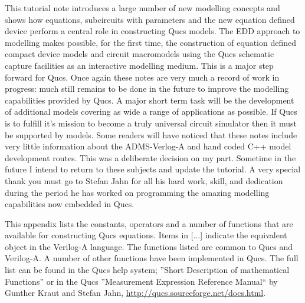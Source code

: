 
This tutorial note introduces a large number of new modelling concepts
and shows how equations, subcircuits with parameters and the new
equation defined device perform a central role in constructing Qucs
models. The EDD approach to modelling makes possible, for the first
time, the construction of equation defined compact device models and
circuit macromodels using the Qucs schematic capture facilities as an
interactive modelling medium.  This is a major step forward for
Qucs. Once again these notes are very much a record of work in
progress: much still remains to be done in the future to improve the
modelling capabilities provided by Qucs. A major short term task will
be the development of additional models covering as wide a range of
applications as possible. If Qucs is to fulfill it's mission to become
a truly universal circuit simulator then it must be supported by
models.  Some readers will have noticed that these notes include very
little information about the ADMS-Verlog-A and hand coded C++ model
development routes. This was a deliberate decision on my
part. Sometime in the future I intend to return to these subjects and
update the tutorial.  A very special thank you must go to Stefan Jahn
for all his hard work, skill, and dedication during the period he has
worked on programming the amazing modelling capabilities now embedded
in Qucs.

\newpage 


This appendix lists the constants, operators and a number of functions
that are available for constructing Qucs equations. Items in [...]
indicate the equivalent object in the Verilog-A language. The
functions listed are common to Qucs and Verilog-A. A number of other
functions have been implemented in Qucs. The full list can be found in
the Qucs help system; ''Short Description of mathematical Functions''
or in the Qucs ''Measurement Expression Reference Manual`` by Gunther
Kraut and Stefan Jahn, \url{http://qucs.sourceforge.net/docs.html}.

